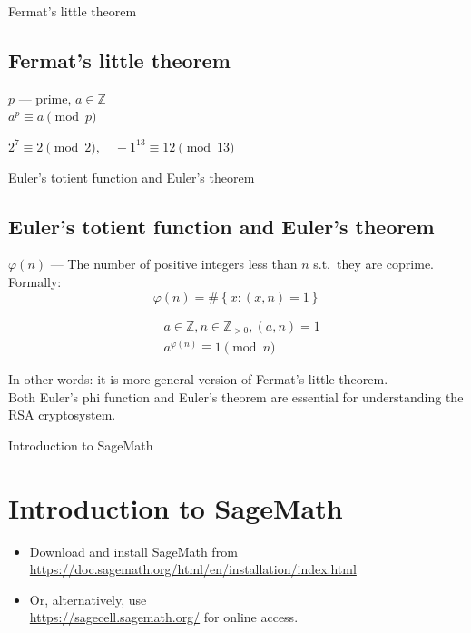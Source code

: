 \documentclass{beamer}
\begin{document}
\begin{frame}{Fermat's little theorem}
    \subsection{Fermat's little theorem}
    \begin{Theorem}
        $p$ --- prime, $a \in \mathbb{Z}$ \\
        $a^p \equiv a \pmod p$
    \end{Theorem}
    \begin{example}
        $ 2^7 \equiv 2 \pmod 2, \quad -1^{13} \equiv 12 \pmod {13} $
    \end{example}
\end{frame}

\begin{frame}{Euler's totient function and Euler's theorem}
    \subsection{Euler's totient function and Euler's theorem}
    \begin{definition}
        $\varphi(n)$ --- The number of positive integers less than $n$ s.t.\ they
        are coprime. Formally:
        \begin{equation*}
            \varphi(n) = \# \left\{ x : (x, n) = 1 \right\}
        \end{equation*} 
    \end{definition}
    \begin{Theorem}
        \begin{eqnarray*}
            & a \in \mathbb{Z}, n \in \mathbb{Z}_{>0}, (a, n) = 1 \\
            & a^{\varphi(n)} \equiv 1 \pmod n
        \end{eqnarray*}
    \end{Theorem}
    In other words: it is more general version of Fermat's little theorem. \\
    Both Euler's phi function and Euler's theorem are essential for 
    understanding the RSA cryptosystem.
\end{frame}

\begin{frame}{Introduction to SageMath}
    \section{Introduction to SageMath}
    \begin{itemize}
        \item Download and install SageMath from \\ 
            \url{https://doc.sagemath.org/html/en/installation/index.html}
        \item Or, alternatively, use \\ 
            \url{https://sagecell.sagemath.org/} for online access.
    \end{itemize}
\end{frame}
\end{document}
